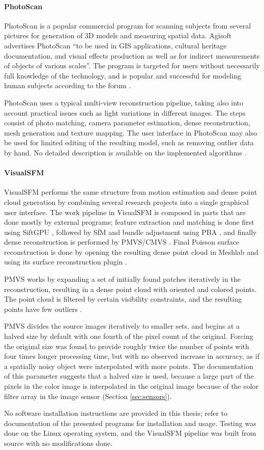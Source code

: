 \paragraph{PhotoScan}
PhotoScan \cite{photoscan} is a popular commercial program for scanning subjects from several pictures for generation of 3D models and measuring spatial data.
Agisoft advertises PhotoScan ``to be used in GIS applications, cultural heritage documentation, and visual effects production as well as for indirect measurements of objects of various scales''.
The program is targeted for users without necessarily full knowledge of the technology, and is popular and successful for modeling human subjects according to the forum \cite{agisoftforum}.

PhotoScan uses a typical multi-view reconstruction pipeline, taking also into account practical issues such as light variations in different images.
The steps consist of photo matching, camera parameter estimation, dense reconstruction, mesh generation and texture mapping.
The user interface in PhotoScan may also be used for limited editing of the resulting model, such as removing outlier data by hand.
No detailed description is available on the implemented algorithms \cite{photoscanalgorithms}.

\paragraph{VisualSFM}
VisualSFM \cite{wu2013towards} performs the same structure from motion estimation and dense point cloud generation by combining several research projects into a single graphical user interface.
The work pipeline in VisualSFM is composed in parts that are done mostly by external programs; feature extraction and matching is done first using SiftGPU \cite{changchang2007siftgpu}, followed by SfM and bundle adjustment using PBA \cite{wu2011multicore}, and finally dense reconstruction is performed by PMVS/CMVS \cite{furukawa2010accurate,furukawa2012patch}.
Final Poisson surface reconstruction is done by opening the resulting dense point cloud in Meshlab and using its surface reconstruction plugin \cite{meshlab}.

PMVS works by expanding a set of initially found patches iteratively in the reconstruction, resulting in a dense point cloud with oriented and colored points.
The point cloud is filtered by certain visibility constraints, and the resulting points have few outliers \cite{furukawa2012patch}.

PMVS divides the source images iteratively to smaller sets, and begins at a halved size by default with one fourth of the pixel count of the original.
Forcing the original size was found to provide roughly twice the number of points with four times longer processing time, but with no observed increase in accuracy, as if a spatially noisy object were interpolated with more points.
The documentation of this parameter suggests that a halved size is used, because a large part of the pixels in the color image is interpolated in the original image because of the color filter array in the image sensor (Section \ref{sec:sensors}).

No software installation instructions are provided in this thesis; refer to documentation of the presented programs for installation and usage.
Testing was done on the Linux operating system, and the VisualSFM pipeline was built from source with no modifications done.

